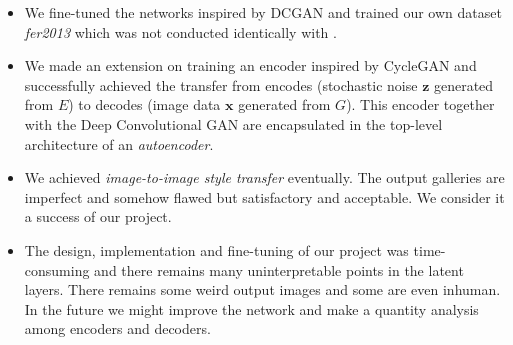 \documentclass[runningheads]{llncs}
\begin{document}
\begin{itemize}
\item We fine-tuned the networks inspired by DCGAN and trained our own dataset \textit{fer2013} which was not conducted identically with \cite{radford_metz_chintala_2016}.
\item We made an extension on training an encoder inspired by CycleGAN and successfully achieved the transfer from encodes (stochastic noise $\mathbf{z}$ generated from $E$) to decodes (image data $\mathbf{x}$ generated from $G$). This encoder together with the Deep Convolutional GAN are encapsulated in the top-level architecture of an \textit{autoencoder}.
\item We achieved \textit{image-to-image style transfer} eventually. The output galleries are imperfect and somehow flawed but satisfactory and acceptable. We consider it a success of our project.
\item The design, implementation and fine-tuning of our project was time-consuming and there remains many uninterpretable points in the latent layers. There remains some weird output images and some are even inhuman. In the future we might improve the network and make a quantity analysis among encoders and decoders. \clearpage
\end{itemize}



\end{document}
